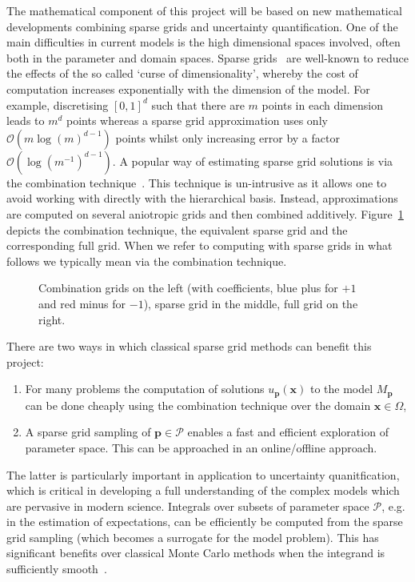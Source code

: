 \documentclass[a4paper,fontsize=12pt]{scrartcl}
\begin{document}
The mathematical component of this project will be based on new mathematical developments combining sparse grids and uncertainty quantification.
One of the main difficulties in current models is the high dimensional spaces involved, often both in the parameter and domain spaces.
Sparse grids~\cite{BungartzGriebel2004} are well-known to reduce the effects of the so called 
`curse of dimensionality', whereby the cost of computation increases 
exponentially with the dimension of the model. 
For example, discretising $[0,1]^{d}$ such that there are $m$ points in each dimension leads to $m^{d}$ points whereas a sparse grid approximation uses only $\mathcal{O}(m\log(m)^{d-1})$ points whilst only increasing error by a factor $\mathcal{O}(\log(m^{-1})^{d-1})$.
A popular way of estimating sparse grid solutions is via the combination technique~\cite{Griebel1990}. 
This technique is un-intrusive as it allows one to avoid working with directly with the hierarchical basis.
Instead, approximations are computed on several aniotropic grids and then combined additively.
Figure~\ref{fig:sparse_grids} depicts the combination technique, the equivalent sparse grid and the corresponding full grid.
When we refer to computing with sparse grids in what follows we typically mean via the combination technique.

\begin{figure}[h!]
\centering

\caption{Combination grids on the left (with coefficients, blue plus for $+1$ and red minus for $-1$), sparse grid in the middle, full grid on the right.}\label{fig:sparse_grids}
\end{figure}

There are two ways in which classical sparse grid methods can benefit this 
project:
\begin{enumerate}
\item For many problems the computation of solutions 
$u_{\mathbf{p}}(\mathbf{x})$ to the model $M_{\mathbf{p}}$ can be done 
cheaply using the combination technique over the domain $\mathbf{x}\in\Omega$,
\item A sparse grid sampling of $\mathbf{p}\in\mathcal{P}$ enables a fast 
and efficient exploration of parameter space. This can be approached in an online/offline approach.
\end{enumerate}
The latter is particularly important in application to uncertainty quanitfication, which is critical in developing a full understanding of the complex models which are pervasive in modern science.
Integrals over subsets of parameter space $\mathcal{P}$, e.g. in the estimation of expectations, can be efficiently be computed from the sparse grid sampling (which becomes a surrogate for the model problem).
This has significant benefits over classical Monte Carlo methods when the integrand is sufficiently smooth~\cite{JakemanRoberts2013,FranzelinDiehlPfluger2014}.
\end{document}
